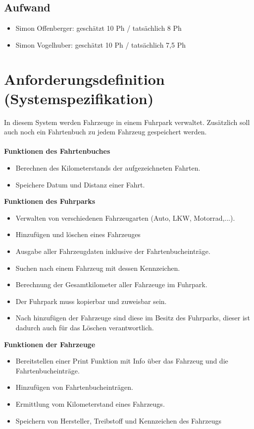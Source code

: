 \documentclass[12pt,naustrian,a4widepaper]{scrartcl}
\begin{document}
\subsection{Aufwand}
	
	\begin{itemize}
		\item Simon Offenberger: geschätzt 10 Ph / tatsächlich 8 Ph
		\item Simon Vogelhuber:  geschätzt 10 Ph / tatsächlich 7,5 Ph
	\end{itemize}

\clearpage
\section{Anforderungsdefinition (Systemspezifikation)}
In diesem System werden Fahrzeuge in einem Fuhrpark verwaltet. 
Zusätzlich soll auch noch ein Fahrtenbuch zu jedem Fahrzeug gespeichert werden.
\\
\\
\textbf{Funktionen des Fahrtenbuches}
\begin{itemize}
	\item Berechnen des Kilometerstands der aufgezeichneten Fahrten.
	\item Speichere Datum und Distanz einer Fahrt.
\end{itemize}

\textbf{Funktionen des Fuhrparks}
\begin{itemize}
	\item Verwalten von verschiedenen Fahrzeugarten (Auto, LKW, Motorrad,...).
	\item Hinzufügen und löschen eines Fahrzeuges
	\item Ausgabe aller Fahrzeugdaten inklusive der Fahrtenbucheinträge.
	\item Suchen nach einem Fahrzeug mit dessen Kennzeichen.
	\item Berechnung der Gesamtkilometer aller Fahrzeuge im Fuhrpark.
	\item Der Fuhrpark muss kopierbar und zuweisbar sein.
	\item Nach hinzufügen der Fahrzeuge sind diese im Besitz des Fuhrparks, dieser ist dadurch auch für das Löschen verantwortlich.
\end{itemize}

\textbf{Funktionen der Fahrzeuge}
\begin{itemize}
	\item Bereitstellen einer Print Funktion mit Info über das Fahrzeug und die Fahrtenbucheinträge.
	\item Hinzufügen von Fahrtenbucheinträgen.
	\item Ermittlung vom Kilometerstand eines Fahrzeugs.
	\item Speichern von Hersteller, Treibstoff und Kennzeichen des Fahrzeugs
\end{itemize}
\end{document}
